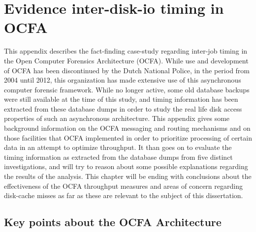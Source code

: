 \chapter{Evidence inter-disk-io timing in OCFA}
This appendix describes the fact-finding case-study regarding inter-job timing in the Open Computer Forensics Architecture (OCFA). While use and development of OCFA has been discontinued by the Dutch National Police, in the period from 2004 until 2012, this organization has made extensive use of this asynchronous computer forensic framework. While no longer active, some old database backups were still available at the time of this study, and timing information has been extracted from these database dumps in order to study the real life disk access properties of such an asynchronous architecture. This appendix gives some background information on the OCFA messaging and routing mechanisms and on those facilities that OCFA implemented in order to prioritize processing of certain data in an attempt to optimize throughput. 
It than goes on to evaluate the timing information as extracted from the database dumps from five distinct investigations, and will try to reason about some possible explanations regarding the results of the analysis. This chapter will be ending with conclusions about the effectiveness of the OCFA throughput measures and areas of concern regarding disk-cache misses as far as these are relevant to the subject of this dissertation.
\section{Key points about the OCFA Architecture}
